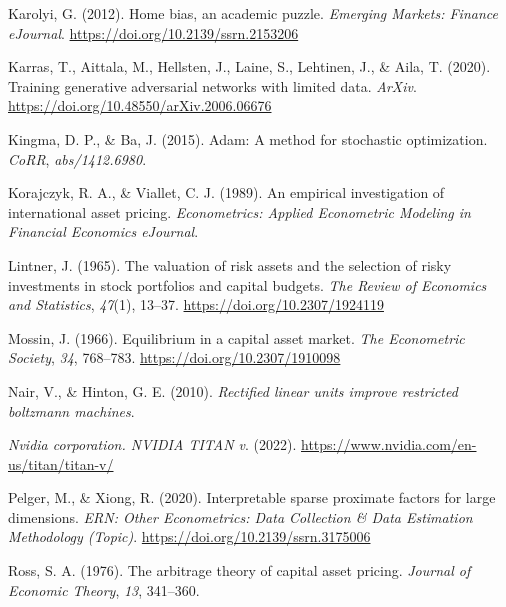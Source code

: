 \documentclass[12pt]{article}
\newlength{\cslhangindent}
\newlength{\cslentryspacingunit} %
\newenvironment{CSLReferences}[2] %
 {%
  \setlength{\parindent}{0pt}
  \ifodd #1
  \let\oldpar\par
  \def\par{\hangindent=\cslhangindent\oldpar}
  \fi
  \setlength{\parskip}{#2\cslentryspacingunit}
 }%
 {}
\begin{document}
\begin{CSLReferences}{1}{0}
\leavevmode{}%
Karolyi, G. (2012). Home bias, an academic puzzle. \emph{Emerging Markets: Finance {eJournal}}. \url{https://doi.org/10.2139/ssrn.2153206}

\leavevmode{}%
Karras, T., Aittala, M., Hellsten, J., Laine, S., Lehtinen, J., \& Aila, T. (2020). Training generative adversarial networks with limited data. \emph{{ArXiv}}. \url{https://doi.org/10.48550/arXiv.2006.06676}

\leavevmode{}%
Kingma, D. P., \& Ba, J. (2015). Adam: A method for stochastic optimization. \emph{{CoRR}}, \emph{abs/1412.6980}.

\leavevmode{}%
Korajczyk, R. A., \& Viallet, C. J. (1989). An empirical investigation of international asset pricing. \emph{Econometrics: Applied Econometric Modeling in Financial Economics {eJournal}}.

\leavevmode{}%
Lintner, J. (1965). The valuation of risk assets and the selection of risky investments in stock portfolios and capital budgets. \emph{The Review of Economics and Statistics}, \emph{47}(1), 13--37. \url{https://doi.org/10.2307/1924119}

\leavevmode{}%
Mossin, J. (1966). Equilibrium in a capital asset market. \emph{The Econometric Society}, \emph{34}, 768--783. \url{https://doi.org/10.2307/1910098}

\leavevmode{}%
Nair, V., \& Hinton, G. E. (2010). \emph{Rectified linear units improve restricted boltzmann machines}.

\leavevmode{}%
\emph{Nvidia corporation. {NVIDIA} {TITAN} v}. (2022). \url{https://www.nvidia.com/en-us/titan/titan-v/}

\leavevmode{}%
Pelger, M., \& Xiong, R. (2020). Interpretable sparse proximate factors for large dimensions. \emph{{ERN}: Other Econometrics: Data Collection \& Data Estimation Methodology (Topic)}. \url{https://doi.org/10.2139/ssrn.3175006}

\leavevmode{}%
Ross, S. A. (1976). The arbitrage theory of capital asset pricing. \emph{Journal of Economic Theory}, \emph{13}, 341--360.


\end{CSLReferences}
\end{document}
